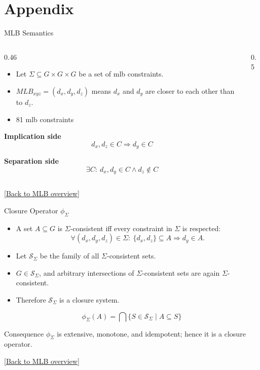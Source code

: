 \section{Appendix}

\begin{frame}{MLB Semantics}
\hypertarget{appendix:mlb-defs}{}
\begin{columns}[T,onlytextwidth]
\begin{column}{0.46\textwidth}
\begin{itemize}
    \item Let $\Sigma \subseteq G \times G \times G$ be a set of \ac{mlb} constraints.
    \item $MLB_{x y z}=(d_x,d_y,d_z)$ means $d_x$ and $d_y$ are closer to each other than to $d_z$.
    \item 81 \ac{mlb} constraints
\end{itemize}

\vspace{0.25em}
\textbf{Implication side}
\[
  d_x,d_z \in C \Rightarrow d_y \in C
\]

\textbf{Separation side}
\[
  \exists C:\ d_x,d_y \in C \land d_z \notin C
\]
\end{column}
\begin{column}{0.5\textwidth}
\banksearchHierarchyToMLB{}
\end{column}
\end{columns}
{\tiny[\hyperlink{main:mlb-constraints}{Back to MLB overview}]}
\end{frame}

\begin{frame}{Closure Operator $\phi_{\Sigma}$}
\hypertarget{appendix:closure-proof}{}
\begin{itemize}
    \item A set $A \subseteq G$ is $\Sigma$-consistent iff every constraint in $\Sigma$ is respected:
    \[
      \forall(d_x,d_y,d_z)\in\Sigma:\ \{d_x,d_z\}\subseteq A \Rightarrow d_y\in A .
    \]
    \item Let $\mathcal{S}_{\Sigma}$ be the family of all $\Sigma$-consistent sets.
    \item $G \in \mathcal{S}_{\Sigma}$, and arbitrary intersections of $\Sigma$-consistent sets are again $\Sigma$-consistent.
    \item Therefore $\mathcal{S}_{\Sigma}$ is a closure system.
\end{itemize}

\[
  \phi_{\Sigma}(A)
  =
  \bigcap \{ S \in \mathcal{S}_{\Sigma} \mid A \subseteq S \}
\]

\begin{block}{Consequence}
$\phi_{\Sigma}$ is extensive, monotone, and idempotent; hence it is a closure operator.
\end{block}
{\tiny[\hyperlink{main:mlb-constraints}{Back to MLB overview}]}
\end{frame}


